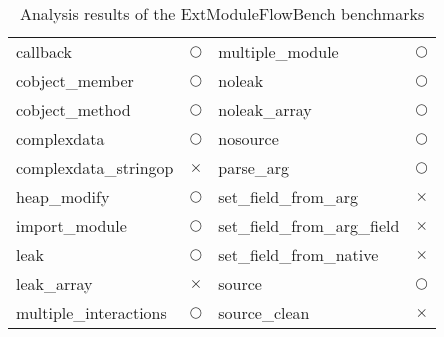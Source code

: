 \begin{table*}[t]
  \vspace{2mm}
  \caption{Analysis results of the ExtModuleFlowBench benchmarks}
  \label{table:RQ1-3}
  \vspace*{-1em}
  \centering
  \small
\renewcommand{\arraystretch}{.9}
  \begin{tabular}{@{}l|c||l|c@{}}
    callback                    & $\bigcirc$  & multiple\_module             & $\bigcirc$  \\
    cobject\_member             & $\bigcirc$  & noleak                       & $\bigcirc$  \\
    cobject\_method             & $\bigcirc$  & noleak\_array                & $\bigcirc$  \\
    complexdata                 & $\bigcirc$  & nosource                     & $\bigcirc$  \\
    complexdata\_stringop       & $\times$    & parse\_arg                   & $\bigcirc$  \\
    heap\_modify                & $\bigcirc$  & set\_field\_from\_arg        & $\times$    \\
    import\_module              & $\bigcirc$  & set\_field\_from\_arg\_field & $\times$    \\
    leak                        & $\bigcirc$  & set\_field\_from\_native     & $\times$    \\
    leak\_array                 & $\times$    & source                       & $\bigcirc$  \\
    multiple\_interactions      & $\bigcirc$  & source\_clean                & $\times$
  \end{tabular}
\end{table*}
